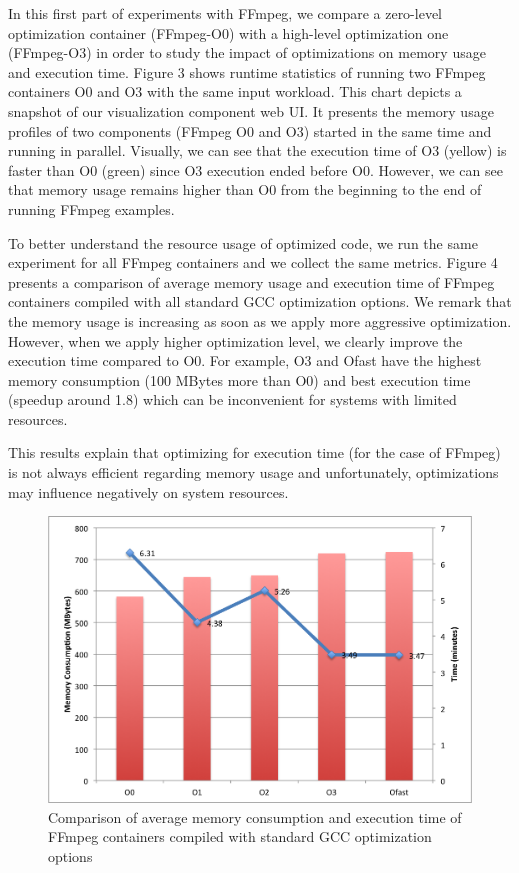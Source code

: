 In this first part of experiments with FFmpeg, we compare a zero-level optimization container (FFmpeg-O0) with a high-level optimization one (FFmpeg-O3) in order to study the impact of optimizations on memory usage and execution time. Figure 3 shows runtime statistics of running two FFmpeg containers O0 and O3 with the same input workload. This chart depicts a snapshot of our visualization component web UI. It presents the memory usage profiles of two components (FFmpeg O0 and O3) started in the same time and running in parallel. Visually, we can see that the execution time of O3 (yellow) is faster than O0 (green) since O3 execution ended before O0. However, we can see that memory usage remains higher than O0 from the beginning to the end of running FFmpeg examples. 

To better understand the resource usage of optimized code, we run the same experiment for all FFmpeg containers and we collect the same metrics. Figure 4 presents a comparison of average memory usage and execution time of FFmpeg containers compiled with all standard GCC optimization options. We remark that the memory usage is increasing as soon as we apply more aggressive optimization. However, when we apply higher optimization level, we clearly improve the execution time compared to O0. For example, O3 and Ofast have the highest memory consumption (100 MBytes more than O0) and best execution time (speedup around 1.8) which can be inconvenient for systems with limited resources.

This results explain that optimizing for execution time (for the case of FFmpeg) is not always efficient regarding memory usage and unfortunately, optimizations may influence negatively on system resources.
\begin{figure}[h]
	\centering
	\includegraphics[width=1.\linewidth]{Ressources/infra_ffmpeg_plot1.png}
	\caption{Comparison of average memory consumption and execution time of FFmpeg containers compiled with standard GCC optimization options}
\end{figure}


